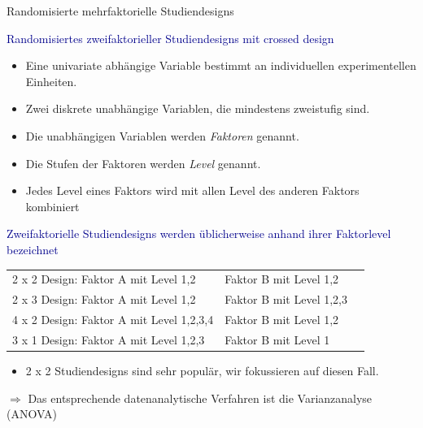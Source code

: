 \documentclass[
  8pt,
  ignorenonframetext,
]{beamer}
\providecommand{\tightlist}{%
  \setlength{\itemsep}{0pt}\setlength{\parskip}{0pt}}
\begin{document}
\begin{frame}{Randomisierte mehrfaktorielle Studiendesigns}
\protect\hypertarget{randomisierte-mehrfaktorielle-studiendesigns-1}{}

\textcolor{darkblue}{Randomisiertes zweifaktorieller Studiendesigns mit crossed design}

\small

\begin{itemize}
\tightlist
\item
  Eine univariate abhängige Variable bestimmt an individuellen
  experimentellen Einheiten.
\item
  Zwei diskrete unabhängige Variablen, die mindestens zweistufig sind.
\item
  Die unabhängigen Variablen werden \textit{Faktoren} genannt.
\item
  Die Stufen der Faktoren werden \textit{Level} genannt.
\item
  Jedes Level eines Faktors wird mit allen Level des anderen Faktors
  kombiniert
\end{itemize}

\normalsize

\textcolor{darkblue}{Zweifaktorielle Studiendesigns werden üblicherweise anhand ihrer Faktorlevel bezeichnet}

\small
\begin{center}
\begin{tabular}{lll}
2 x 2 Design: Faktor A mit Level 1,2     & Faktor B mit Level 1,2       \\
2 x 3 Design: Faktor A mit Level 1,2     & Faktor B mit Level 1,2,3     \\
4 x 2 Design: Faktor A mit Level 1,2,3,4 & Faktor B mit Level 1,2       \\
3 x 1 Design: Faktor A mit Level 1,2,3   & Faktor B mit Level 1
\end{tabular}
\end{center}

\begin{itemize}
\tightlist
\item
  2 x 2 Studiendesigns sind sehr populär, wir fokussieren auf diesen
  Fall.
\end{itemize}

\normalsize

\(\Rightarrow\) Das entsprechende datenanalytische Verfahren ist die
Varianzanalyse (ANOVA)
\end{frame}
\end{document}
